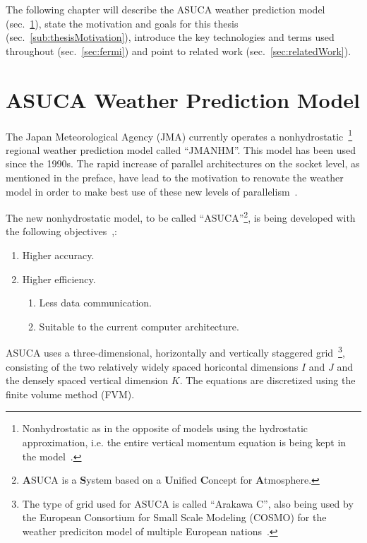The following chapter will describe the ASUCA weather prediction model (sec.~\ref{sec:modelASUCA}), state the motivation and goals for this thesis (sec.~\ref{sub:thesisMotivation}), introduce the key technologies and terms used throughout (sec.~\ref{sec:fermi}) and point to related work (sec.~\ref{sec:relatedWork}).


\section{ASUCA Weather Prediction Model} \label{sec:modelASUCA}

The Japan Meteorological Agency (JMA) currently operates a nonhydrostatic~\footnote{Nonhydrostatic as in the opposite of models using the hydrostatic approximation, i.e. the entire vertical momentum equation is being kept in the model~\cite[p. 138]{jacobsonAtmosphereFundamentals}.} regional weather prediction model called \textquotedblleft JMANHM\textquotedblright. This model has been used since the 1990s. The rapid increase of parallel architectures on the socket level, as mentioned in the preface, have lead to the motivation to renovate the weather model in order to make best use of these new levels of parallelism~\cite[p. 3]{KawanoASUCA}.

The new nonhydrostatic model, to be called \textquotedblleft ASUCA\textquotedblright\footnote{\textbf{A}SUCA is a \textbf{S}ystem based on a \textbf{U}nified \textbf{C}oncept for \textbf{A}tmosphere.}, is being developed with the following objectives~\cite[p. 1]{ASUCA2010},\cite[p. 4]{KawanoASUCA}: 
\begin{enumerate}
 \item Higher accuracy.
 \item Higher efficiency.
  \begin{enumerate}
   \item Less data communication.
   \item Suitable to the current computer architecture.
  \end{enumerate}
\end{enumerate}

ASUCA uses a three-dimensional, horizontally and vertically staggered grid~\footnote{The type of grid used for ASUCA is called ``Arakawa C'', also being used by the European Consortium for Small Scale Modeling (COSMO) for the weather prediciton model of multiple European nations~\cite[p. 4]{baldaufWetterdienstCourse}.}, consisting of the two relatively widely spaced horicontal dimensions $I$ and $J$ and the densely spaced vertical dimension $K$. The equations are discretized using the finite volume method (FVM).~\cite[p. 2]{Shimokawabe2010}

